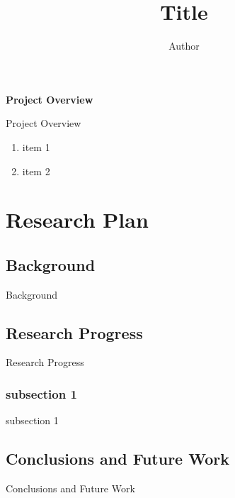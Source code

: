 \documentclass[12pt]{report}
\title{Title}
\author{Author}
\begin{document}
\begin{titlepage}
\cleardoublepage
\thispagestyle{empty}

\noindent
\textbf{Project Overview}

Project Overview
\begin{enumerate}
\item item 1
\item item 2
\end{enumerate}

\end{titlepage}

\cleardoublepage
\thispagestyle{empty}

\begingroup
\let\clearpage\relax
\tableofcontents
\endgroup

\cleardoublepage
\setcounter{chapter}{1}


\newpage
\chapter{Research Plan}
\section{Background}
Background\cite{dirac}

\section{Research Progress}
Research Progress
\subsection{subsection 1}
subsection 1
\section{Conclusions and Future Work}
Conclusions and Future Work
\newpage
{}


\end{document}
